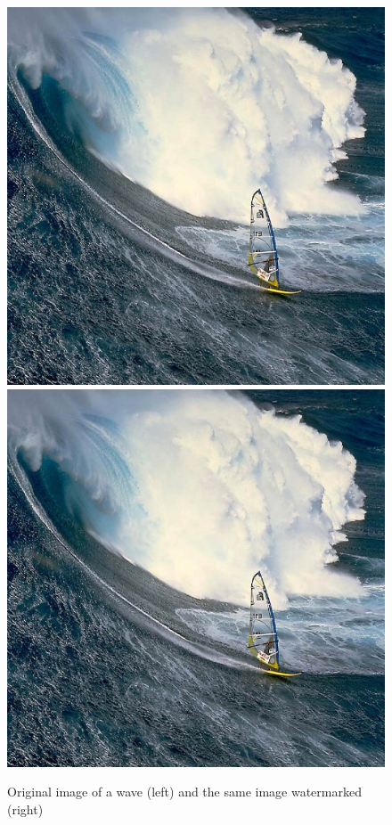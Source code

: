 \documentclass[11pt, oneside]{article}   	%
\begin{document}
			\begin{figure}[h!]
			\begin{center}
				\includegraphics[scale=0.34]{images_png/image8.jpg}
				\includegraphics[scale=0.34]{images_png/image9.jpg}
			\end{center}
			\caption{Original image of a wave (left) and the same image watermarked (right)}
			\end{figure}
\end{document}
